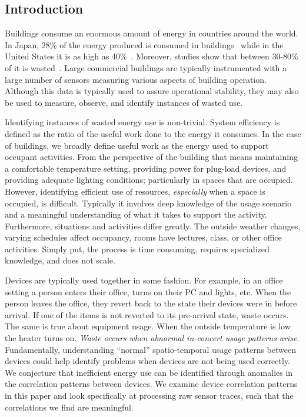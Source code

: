 \subsection{Introduction}
Buildings consume an enormous amount of energy in countries around the world.  In 
Japan, 28\% of the energy produced is consumed in buildings~\cite{japanbuildings} while in the United 
States it is as high as 40\%~\cite{epabuildings}.  Moreover, studies show that between 30-80\% of it
is wasted~\cite{waste_science, next10_waste}.  Large commercial buildings are typically instrumented
with a large number of sensors measuring various aspects of building operation.  Although this data is
typically used to assure operational stability, they may also be used to measure, observe, and identify
instances of wasted use.

Identifying instances of wasted energy use is non-trivial.  System efficiency is defined as the ratio of the 
useful work done to the energy it consumes.  In the case of buildings, we broadly define useful work as 
the energy used to support occupant activities.  From the perspective of the building that means maintaining
a comfortable temperature setting, providing power for plug-load devices, and providing adequate lighting
conditions; particularly in spaces that are occupied.  However, identifying efficient use of resources,
\emph{especially} when a space is occupied, is difficult.  Typically it involves deep knowledge of the usage scenario and
a meaningful understanding of what it takes to support the activity.  Furthermore, situations and activities differ
greatly.  The outside weather changes, varying schedules affect occupancy, rooms have lectures, class,
or other office activities.  Simply put, the process is time consuming, requires specialized knowledge,
and does not scale.

Devices are typically used together in some fashion.  For example, in an office
setting a person enters their office, turns on their PC and lights, etc.
When the person leaves the office, they revert back to the state their devices were in before arrival.
If one of the items is not reverted to its pre-arrival state, waste occurs. 
The same is true about equipment usage.  When the outside temperature is low the heater turns on.
\emph{Waste occurs when abnormal in-concert usage patterns arise}.  
Fundamentally, understanding ``normal'' spatio-temporal usage patterns between devices could help
identify problems when devices are not being used correctly.
We conjecture that inefficient energy use can be identified through anomalies in the correlation
patterns between devices.  We examine device correlation patterns in this paper and look specifically
at processing raw sensor traces, such that the correlations we find are meaningful.

